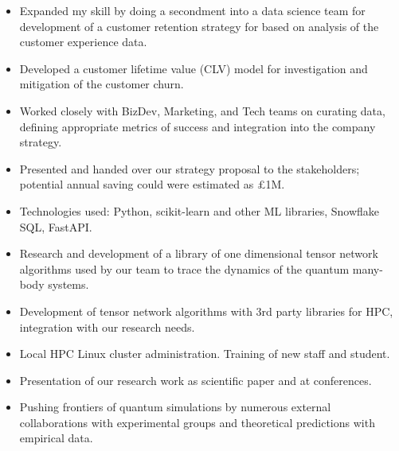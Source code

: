 \documentclass[10pt,a4paper,ragged2e,withhyper]{altacv}
\begin{document}
\begin{paracol}{2}
\begin{itemize}

    \item
    Expanded my skill by doing a secondment into a data science team for
    development of a customer retention strategy for based on analysis of the
    customer experience data.
    
    \item
    Developed a customer lifetime value (CLV) model for investigation and
    mitigation of the customer churn.

    \item
    Worked closely with BizDev, Marketing, and Tech teams on curating data,
    defining appropriate metrics of success and integration into the company
    strategy.

    \item
    Presented and handed over our strategy proposal to the stakeholders; 
    potential annual saving could were estimated as £1M.

    \item
    Technologies used: Python, scikit-learn and other ML libraries,
    Snowflake SQL, FastAPI.

\end{itemize}

\divider


\begin{itemize}

    \item
    Research and development of a library of one dimensional tensor network
    algorithms used by our team to trace the dynamics of the quantum many-body
    systems.

    \item
    Development of tensor network algorithms with 3rd party libraries for HPC,
    integration with our research needs.

    \item
    Local HPC Linux cluster administration. Training of new staff and student.

    \item
    Presentation of our research work as scientific paper and at conferences.
    
    \item
    Pushing frontiers of quantum simulations by numerous external collaborations
    with experimental groups and theoretical predictions with empirical data.


\end{itemize}
\end{paracol}
\end{document}
